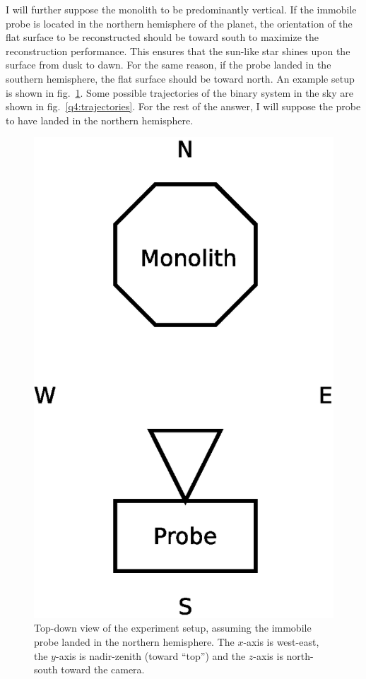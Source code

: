 \documentclass{report}
\begin{document}
I will further suppose the monolith to be predominantly vertical. If the immobile probe is located in the northern hemisphere of the planet, the orientation of the flat surface to be reconstructed should be toward south to maximize the reconstruction performance. This ensures that the sun-like star shines upon the surface from dusk to dawn. For the same reason, if the probe landed in the southern hemisphere, the flat surface should be toward north. An example setup is shown in fig.~\ref{q4:setup}. Some possible trajectories of the binary system in the sky are shown in fig.~\ref{q4:trajectories}. For the rest of the answer, I will suppose the probe to have landed in the northern hemisphere.

\begin{figure}
  \centering
  \includegraphics[width=0.2\linewidth]{q4_setup.eps}
  \caption[Experiment setup]
   {Top-down view of the experiment setup, assuming the immobile probe landed in the northern hemisphere. The $x$-axis is west-east, the $y$-axis is nadir-zenith (toward ``top'') and the $z$-axis is north-south toward the camera. }
  \label{q4:setup}
\end{figure}
\end{document}
